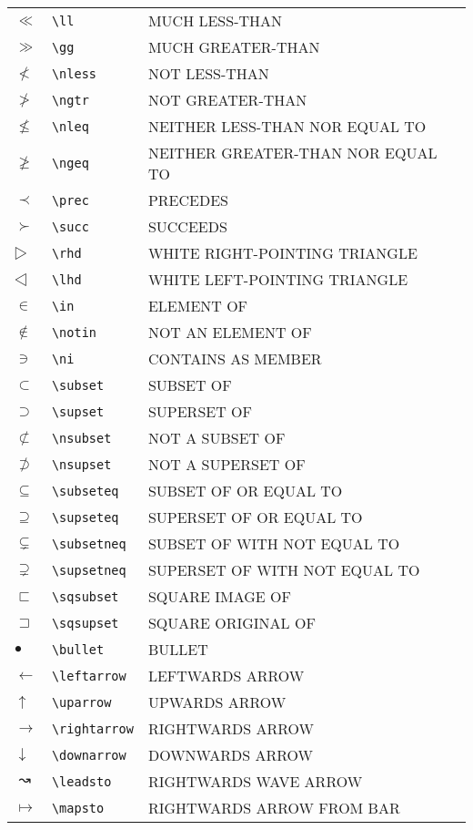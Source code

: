 \begin{center}
\begin{xtabular}{|ll>{\smaller\ttfamily}l|}
  $≪$ & \verb|\ll| & MUCH LESS-THAN \\
  $≫$ & \verb|\gg| & MUCH GREATER-THAN \\
  $≮$ & \verb|\nless| & NOT LESS-THAN \\
  $≯$ & \verb|\ngtr| & NOT GREATER-THAN \\
  $≰$ & \verb|\nleq| & NEITHER LESS-THAN NOR EQUAL TO \\
  $≱$ & \verb|\ngeq| & NEITHER GREATER-THAN NOR EQUAL TO \\
  $≺$ & \verb|\prec| & PRECEDES \\
  $≻$ & \verb|\succ| & SUCCEEDS \\
  $▷$ & \verb|\rhd| & WHITE RIGHT-POINTING TRIANGLE \\
  $◁$ & \verb|\lhd| & WHITE LEFT-POINTING TRIANGLE \\
  $∈$ & \verb|\in| & ELEMENT OF \\
  $∉$ & \verb|\notin| & NOT AN ELEMENT OF \\
  $∋$ & \verb|\ni| & CONTAINS AS MEMBER \\
  $⊂$ & \verb|\subset| & SUBSET OF \\
  $⊃$ & \verb|\supset| & SUPERSET OF \\
  $⊄$ & \verb|\nsubset| & NOT A SUBSET OF \\
  $⊅$ & \verb|\nsupset| & NOT A SUPERSET OF \\
  $⊆$ & \verb|\subseteq| & SUBSET OF OR EQUAL TO \\
  $⊇$ & \verb|\supseteq| & SUPERSET OF OR EQUAL TO \\
  $⊊$ & \verb|\subsetneq| & SUBSET OF WITH NOT EQUAL TO \\
  $⊋$ & \verb|\supsetneq| & SUPERSET OF WITH NOT EQUAL TO \\
  $⊏$ & \verb|\sqsubset| & SQUARE IMAGE OF \\
  $⊐$ & \verb|\sqsupset| & SQUARE ORIGINAL OF \\
  $•$ & \verb|\bullet| & BULLET \\
  $←$ & \verb|\leftarrow| & LEFTWARDS ARROW \\
  $↑$ & \verb|\uparrow| & UPWARDS ARROW \\
  $→$ & \verb|\rightarrow| & RIGHTWARDS ARROW \\
  $↓$ & \verb|\downarrow| & DOWNWARDS ARROW \\
  $↝$ & \verb|\leadsto| & RIGHTWARDS WAVE ARROW \\
  $↦$ & \verb|\mapsto| & RIGHTWARDS ARROW FROM BAR \\

\end{xtabular}
\end{center}
